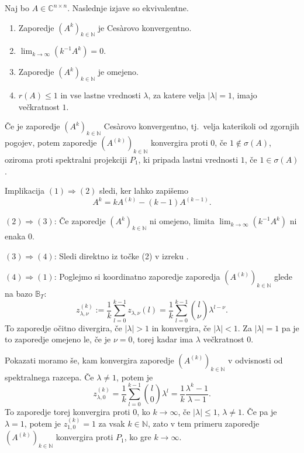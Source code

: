 \documentclass[mat1]{fmfdelo}
\newcommand{\N}{\mathbb N}
\newcommand{\C}{\mathbb C}
\begin{document}
\begin{izrek}\label{izrekCesaro}
    Naj bo $A \in \C^{n \times n}$. Naslednje izjave so ekvivalentne.
    \begin{enumerate}
        \item Zaporedje $(A^k)_{k\in\N}$ je Ces\`arovo konvergentno.
        \item $\lim_{k\rightarrow \infty} \left(k^{-1}A^k\right) = 0$.
        \item Zaporedje $(A^k)_{k\in\N}$ je omejeno.
        \item $r(A) \leq 1$ in vse lastne vrednosti $\lambda$, za katere velja $|\lambda| = 1$, imajo večkratnost $1$.
    \end{enumerate}
    Če je zaporedje $(A^k)_{k\in\N}$ Ces\`arovo konvergentno, tj.\ velja katerikoli od zgornjih pogojev, potem zaporedje $(A^{(k)})_{k\in\N}$ konvergira proti $0$, če $1 \notin \sigma(A)$, oziroma proti spektralni projekciji $P_1$, ki pripada lastni vrednosti $1$, če $1\in\sigma(A)$.
\end{izrek}
\begin{dokaz}
    Implikacija $(1) \Rightarrow (2)$ sledi, ker lahko zapišemo
    \begin{equation*}
        A^k = k A^{(k)} - (k-1) A^{(k-1)}.
    \end{equation*}

    \noindent $(2) \Rightarrow (3)$: Če zaporedje $(A^k)_{k\in\N}$ ni omejeno, limita $\lim_{k\rightarrow \infty} (k^{-1}A^k)$ ni enaka $0$.
    
    \noindent $(3) \Rightarrow (4)$: Sledi direktno iz točke (2) v izreku .
    
    \noindent $(4) \Rightarrow (1)$: Poglejmo si koordinatno zaporedje zaporedja $(A^{(k)})_{k\in\N}$ glede na bazo $\mathbb{B}_T$:
    \begin{equation*}
        z_{\lambda, \nu}^{(k)} := \frac{1}{k} \sum_{l=0}^{k-1} z_{\lambda, \nu} (l) = \frac{1}{k} \sum_{l=0}^{k-1}{l \choose \nu} \lambda^{l - \nu}.
    \end{equation*}
    To zaporedje očitno divergira, če $|\lambda| > 1$ in konvergira, če $|\lambda| < 1$. Za $|\lambda| = 1$ pa je to zaporedje omejeno le, če je $\nu = 0$, torej kadar ima $\lambda$ večkratnost $0$.

    \noindent Pokazati moramo še, kam konvergira zaporedje $(A^{(k)})_{k\in\N}$ v odvisnosti od spektralnega razcepa. Če $\lambda \neq 1$, potem je
    \begin{equation*}
        z_{\lambda, 0}^{(k)} = \frac{1}{k} \sum_{l=0}^{k-1}{l \choose 0} \lambda^{l} = \frac{1}{k}\frac{\lambda^k-1}{\lambda-1}.
    \end{equation*}
    To zaporedje torej konvergira proti $0$, ko $k\rightarrow\infty$, če $|\lambda|\leq 1$, $\lambda \neq 1$. Če pa je $\lambda = 1$, potem je $z_{1, 0}^{(k)} = 1$ za vsak $k \in \N$, zato v tem primeru zaporedje $(A^{(k)})_{k\in\N}$ konvergira proti $P_1$, ko gre $k\rightarrow\infty$. \qedhere

\end{dokaz}
\end{document}
